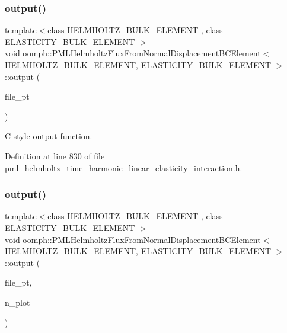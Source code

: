 \subsubsection{\texorpdfstring{output()}{output()}\hspace{0.1cm}{\footnotesize\ttfamily [3/4]}}
{\footnotesize\ttfamily template$<$class H\+E\+L\+M\+H\+O\+L\+T\+Z\+\_\+\+B\+U\+L\+K\+\_\+\+E\+L\+E\+M\+E\+NT , class E\+L\+A\+S\+T\+I\+C\+I\+T\+Y\+\_\+\+B\+U\+L\+K\+\_\+\+E\+L\+E\+M\+E\+NT $>$ \\
void \hyperlink{classoomph_1_1PMLHelmholtzFluxFromNormalDisplacementBCElement}{oomph\+::\+P\+M\+L\+Helmholtz\+Flux\+From\+Normal\+Displacement\+B\+C\+Element}$<$ H\+E\+L\+M\+H\+O\+L\+T\+Z\+\_\+\+B\+U\+L\+K\+\_\+\+E\+L\+E\+M\+E\+NT, E\+L\+A\+S\+T\+I\+C\+I\+T\+Y\+\_\+\+B\+U\+L\+K\+\_\+\+E\+L\+E\+M\+E\+NT $>$\+::output (\begin{DoxyParamCaption}\item[{F\+I\+LE $\ast$}]{file\+\_\+pt }\end{DoxyParamCaption})\hspace{0.3cm}{\ttfamily [inline]}}



C-\/style output function. 



Definition at line 830 of file pml\+\_\+helmholtz\+\_\+time\+\_\+harmonic\+\_\+linear\+\_\+elasticity\+\_\+interaction.\+h.

\mbox{\label{classoomph_1_1PMLHelmholtzFluxFromNormalDisplacementBCElement_a798feeb0c2f831476e3ded0a91c6a572}} 
\subsubsection{\texorpdfstring{output()}{output()}\hspace{0.1cm}{\footnotesize\ttfamily [4/4]}}
{\footnotesize\ttfamily template$<$class H\+E\+L\+M\+H\+O\+L\+T\+Z\+\_\+\+B\+U\+L\+K\+\_\+\+E\+L\+E\+M\+E\+NT , class E\+L\+A\+S\+T\+I\+C\+I\+T\+Y\+\_\+\+B\+U\+L\+K\+\_\+\+E\+L\+E\+M\+E\+NT $>$ \\
void \hyperlink{classoomph_1_1PMLHelmholtzFluxFromNormalDisplacementBCElement}{oomph\+::\+P\+M\+L\+Helmholtz\+Flux\+From\+Normal\+Displacement\+B\+C\+Element}$<$ H\+E\+L\+M\+H\+O\+L\+T\+Z\+\_\+\+B\+U\+L\+K\+\_\+\+E\+L\+E\+M\+E\+NT, E\+L\+A\+S\+T\+I\+C\+I\+T\+Y\+\_\+\+B\+U\+L\+K\+\_\+\+E\+L\+E\+M\+E\+NT $>$\+::output (\begin{DoxyParamCaption}\item[{F\+I\+LE $\ast$}]{file\+\_\+pt,  }\item[{const unsigned \&}]{n\+\_\+plot }\end{DoxyParamCaption})\hspace{0.3cm}{\ttfamily [inline]}}



